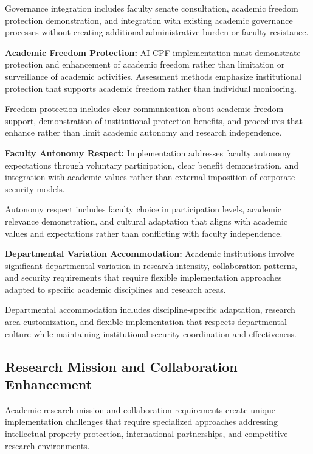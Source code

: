 \documentclass[10pt, twocolumn]{article}
\begin{document}
Governance integration includes faculty senate consultation, academic freedom protection demonstration, and integration with existing academic governance processes without creating additional administrative burden or faculty resistance.

\textbf{Academic Freedom Protection:} AI-CPF implementation must demonstrate protection and enhancement of academic freedom rather than limitation or surveillance of academic activities. Assessment methods emphasize institutional protection that supports academic freedom rather than individual monitoring.

Freedom protection includes clear communication about academic freedom support, demonstration of institutional protection benefits, and procedures that enhance rather than limit academic autonomy and research independence.

\textbf{Faculty Autonomy Respect:} Implementation addresses faculty autonomy expectations through voluntary participation, clear benefit demonstration, and integration with academic values rather than external imposition of corporate security models.

Autonomy respect includes faculty choice in participation levels, academic relevance demonstration, and cultural adaptation that aligns with academic values and expectations rather than conflicting with faculty independence.

\textbf{Departmental Variation Accommodation:} Academic institutions involve significant departmental variation in research intensity, collaboration patterns, and security requirements that require flexible implementation approaches adapted to specific academic disciplines and research areas.

Departmental accommodation includes discipline-specific adaptation, research area customization, and flexible implementation that respects departmental culture while maintaining institutional security coordination and effectiveness.

\subsection{Research Mission and Collaboration Enhancement}

Academic research mission and collaboration requirements create unique implementation challenges that require specialized approaches addressing intellectual property protection, international partnerships, and competitive research environments.
\end{document}
